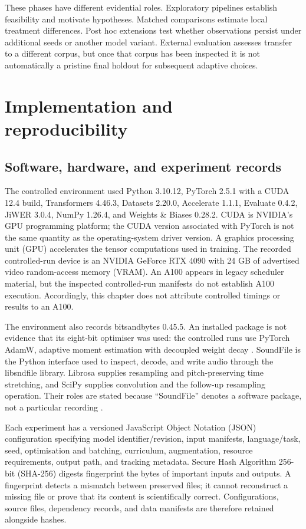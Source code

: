 \documentclass[12pt,a4paper]{report}
\begin{document}
These phases have different evidential roles. Exploratory pipelines establish feasibility and motivate hypotheses. Matched comparisons estimate local treatment differences. Post hoc extensions test whether observations persist under additional seeds or another model variant. External evaluation assesses transfer to a different corpus, but once that corpus has been inspected it is not automatically a pristine final holdout for subsequent adaptive choices.

\section{Implementation and reproducibility}

\subsection{Software, hardware, and experiment records}

The controlled environment used Python 3.10.12, PyTorch 2.5.1 with a CUDA 12.4 build, Transformers 4.46.3, Datasets 2.20.0, Accelerate 1.1.1, Evaluate 0.4.2, JiWER 3.0.4, NumPy 1.26.4, and Weights \& Biases 0.28.2. CUDA is NVIDIA's GPU programming platform; the CUDA version associated with PyTorch is not the same quantity as the operating-system driver version. A graphics processing unit (GPU) accelerates the tensor computations used in training. The recorded controlled-run device is an NVIDIA GeForce RTX 4090 with 24 GB of advertised video random-access memory (VRAM). An A100 appears in legacy scheduler material, but the inspected controlled-run manifests do not establish A100 execution. Accordingly, this chapter does not attribute controlled timings or results to an A100.

The environment also records bitsandbytes 0.45.5. An installed package is not evidence that its eight-bit optimiser was used: the controlled runs use PyTorch AdamW, adaptive moment estimation with decoupled weight decay \citep{Loshchilov2019}. SoundFile is the Python interface used to inspect, decode, and write audio through the libsndfile library. Librosa supplies resampling and pitch-preserving time stretching, and SciPy supplies convolution and the follow-up resampling operation. Their roles are stated because ``SoundFile'' denotes a software package, not a particular recording \citep{SoundFile,Librosa}.

Each experiment has a versioned JavaScript Object Notation (JSON) configuration specifying model identifier/revision, input manifests, language/task, seed, optimisation and batching, curriculum, augmentation, resource requirements, output path, and tracking metadata. Secure Hash Algorithm 256-bit (SHA-256) digests fingerprint the bytes of important inputs and outputs. A fingerprint detects a mismatch between preserved files; it cannot reconstruct a missing file or prove that its content is scientifically correct. Configurations, source files, dependency records, and data manifests are therefore retained alongside hashes.
\end{document}
